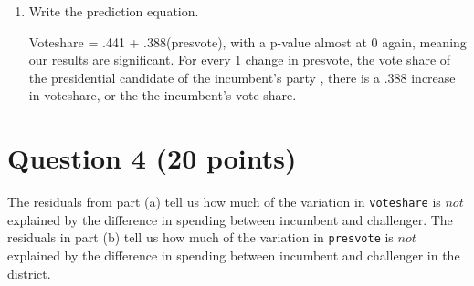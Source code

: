 \documentclass[12pt,letterpaper]{article}
\begin{document}
\begin{enumerate}
\newpage
		\item Write the prediction equation.
			
Voteshare = .441 + .388(presvote), with a p-value almost at 0 again, meaning our results are significant. For every 1 change in presvote, the vote share of the presidential candidate of the incumbent’s party , there is a .388 increase in voteshare, or the the incumbent’s vote share.
			
	\end{enumerate}
	

\newpage	
\section*{Question 4 (20 points)}
\noindent The residuals from part (a) tell us how much of the variation in \texttt{voteshare} is $not$ explained by the difference in spending between incumbent and challenger. The residuals in part (b) tell us how much of the variation in \texttt{presvote} is $not$ explained by the difference in spending between incumbent and challenger in the district.
\end{document}
